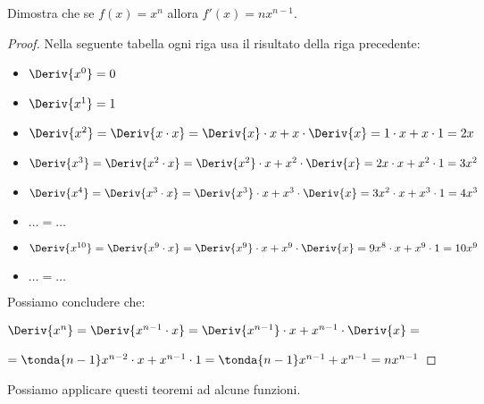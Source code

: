 \begin{esempio}
%
Dimostra che se \(f(x) = x^n\) allora \(f'(x) = n x^{n-1}\).

\begin{proof}
Nella seguente tabella ogni riga usa il risultato della riga precedente:
\begin{itemize} [nosep]
\item \(\Deriv{x^0} = 0\)
\item \(\Deriv{x^1} = 1\)
\item 
\(\Deriv{x^2} = \Deriv{x \cdot x} = 
  \Deriv{x} \cdot x +x \cdot \Deriv{x} = 1 \cdot x +x \cdot 1 = 2x\)
\item 
\(\Deriv{x^3} = \Deriv{x^2 \cdot x} = 
  \Deriv{x^2} \cdot x +x^2 \cdot \Deriv{x} = 2x \cdot x +x^2 \cdot 1 = 3x^2\)
\item 
\(\Deriv{x^4} = \Deriv{x^3 \cdot x} = 
  \Deriv{x^3} \cdot x +x^3 \cdot \Deriv{x}=3x^2 \cdot x +x^3 \cdot 1=4x^3\)
\item \(\dots = \dots\)
\item 
\(\Deriv{x^{10}} = \Deriv{x^9 \cdot x} = 
  \Deriv{x^9} \cdot x +x^9 \cdot \Deriv{x}=9x^8 \cdot x +x^9 \cdot 1=10x^9\)
\item \(\dots = \dots\)
\end{itemize}
Possiamo concludere che:

\hspace{0mm} 
\(\Deriv{x^n} = \Deriv{x^{n-1} \cdot x} = 
  \Deriv{x^{n-1}} \cdot x +x^{n-1} \cdot \Deriv{x}= \)

\hspace{10.5mm} 
\(= \tonda{n-1}x^{n-2} \cdot x +x^{n-1} \cdot 1 
  = \tonda{n-1}x^{n-1} +x^{n-1} = nx^{n-1}\)
\end{proof}
\end{esempio}

Possiamo applicare questi teoremi ad alcune funzioni.


